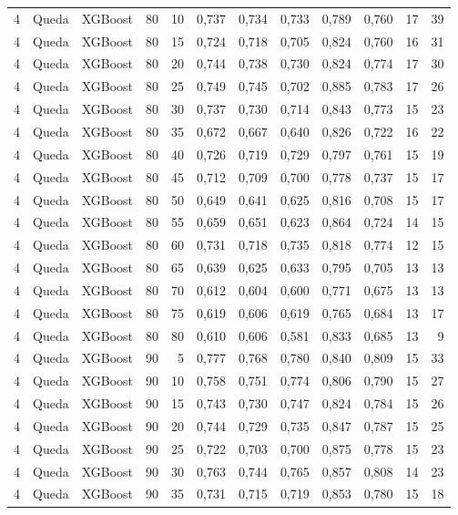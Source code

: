 \begin{longtable}{@{}rllrrrrrrrrr@{}}
4 & Queda & XGBoost & 80 & 10 & 0,737 & 0,734 & 0,733 & 0,789 & 0,760 & 17 & 39 \\
4 & Queda & XGBoost & 80 & 15 & 0,724 & 0,718 & 0,705 & 0,824 & 0,760 & 16 & 31 \\
4 & Queda & XGBoost & 80 & 20 & 0,744 & 0,738 & 0,730 & 0,824 & 0,774 & 17 & 30 \\
4 & Queda & XGBoost & 80 & 25 & 0,749 & 0,745 & 0,702 & 0,885 & 0,783 & 17 & 26 \\
4 & Queda & XGBoost & 80 & 30 & 0,737 & 0,730 & 0,714 & 0,843 & 0,773 & 15 & 23 \\
4 & Queda & XGBoost & 80 & 35 & 0,672 & 0,667 & 0,640 & 0,826 & 0,722 & 16 & 22 \\
4 & Queda & XGBoost & 80 & 40 & 0,726 & 0,719 & 0,729 & 0,797 & 0,761 & 15 & 19 \\
4 & Queda & XGBoost & 80 & 45 & 0,712 & 0,709 & 0,700 & 0,778 & 0,737 & 15 & 17 \\
4 & Queda & XGBoost & 80 & 50 & 0,649 & 0,641 & 0,625 & 0,816 & 0,708 & 15 & 17 \\
4 & Queda & XGBoost & 80 & 55 & 0,659 & 0,651 & 0,623 & 0,864 & 0,724 & 14 & 15 \\
4 & Queda & XGBoost & 80 & 60 & 0,731 & 0,718 & 0,735 & 0,818 & 0,774 & 12 & 15 \\
4 & Queda & XGBoost & 80 & 65 & 0,639 & 0,625 & 0,633 & 0,795 & 0,705 & 13 & 13 \\
4 & Queda & XGBoost & 80 & 70 & 0,612 & 0,604 & 0,600 & 0,771 & 0,675 & 13 & 13 \\
4 & Queda & XGBoost & 80 & 75 & 0,619 & 0,606 & 0,619 & 0,765 & 0,684 & 13 & 17 \\
4 & Queda & XGBoost & 80 & 80 & 0,610 & 0,606 & 0,581 & 0,833 & 0,685 & 13 & 9 \\
4 & Queda & XGBoost & 90 & 5 & 0,777 & 0,768 & 0,780 & 0,840 & 0,809 & 15 & 33 \\
4 & Queda & XGBoost & 90 & 10 & 0,758 & 0,751 & 0,774 & 0,806 & 0,790 & 15 & 27 \\
4 & Queda & XGBoost & 90 & 15 & 0,743 & 0,730 & 0,747 & 0,824 & 0,784 & 15 & 26 \\
4 & Queda & XGBoost & 90 & 20 & 0,744 & 0,729 & 0,735 & 0,847 & 0,787 & 15 & 25 \\
4 & Queda & XGBoost & 90 & 25 & 0,722 & 0,703 & 0,700 & 0,875 & 0,778 & 15 & 23 \\
4 & Queda & XGBoost & 90 & 30 & 0,763 & 0,744 & 0,765 & 0,857 & 0,808 & 14 & 23 \\
4 & Queda & XGBoost & 90 & 35 & 0,731 & 0,715 & 0,719 & 0,853 & 0,780 & 15 & 18 \\

\end{longtable}
